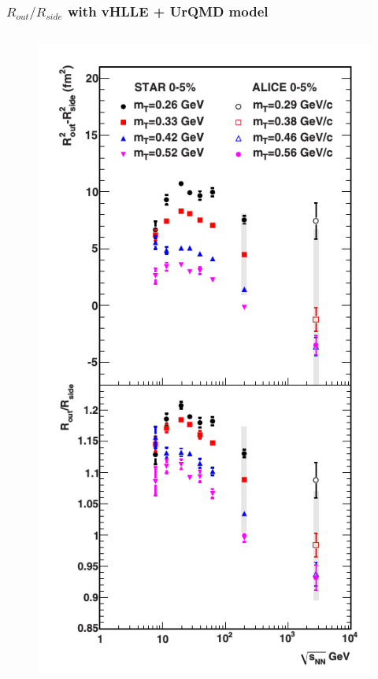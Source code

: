 \documentclass[dvipsnames] {beamer}
\begin{document}
      \begin{frame}
        \frametitle{\bf \centering $R_{out} / R_{side}$  with vHLLE + UrQMD model}
        \bf
        \vskip -1.3cm
        \begin{columns}[t]
          \begin{block}{}     
            \begin{figure}[H]
              \includegraphics[width=1.0\linewidth]{RoutRside_STAR_ALICE.png}
            \end{figure}
          \end{block}


\end{columns}
\end{frame}
\end{document}
